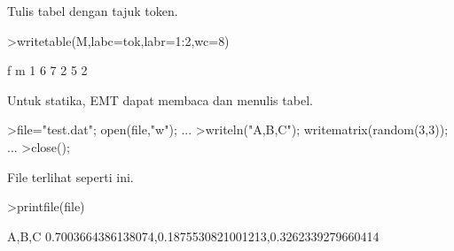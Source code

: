 \documentclass[a4paper,10pt]{article}
\begin{document}
\begin{eulernotebook}
\begin{eulercomment}
\begin{eulercomment}
\begin{eulercomment}
\begin{eulercomment}
\begin{eulercomment}
\begin{eulercomment}
\begin{eulercomment}
\begin{eulercomment}
\begin{eulercomment}
\begin{eulercomment}
\begin{eulercomment}
\begin{eulercomment}
\begin{eulercomment}
\begin{eulercomment}
\begin{eulercomment}
\begin{eulercomment}
\begin{eulercomment}
\begin{eulercomment}
\begin{eulercomment}
\begin{eulercomment}
\begin{eulercomment}
\begin{eulercomment}
\begin{eulercomment}
\begin{eulercomment}
\begin{eulercomment}
\begin{eulercomment}
\begin{eulercomment}
\begin{eulercomment}
\begin{eulercomment}
\begin{eulercomment}
\begin{eulercomment}
\begin{eulercomment}
\begin{eulercomment}
\begin{eulercomment}
\begin{eulercomment}
\begin{eulercomment}
\begin{eulercomment}
\begin{eulercomment}
\begin{eulercomment}
\begin{eulercomment}
\begin{eulercomment}
\begin{eulercomment}
\begin{eulercomment}
\begin{eulercomment}
\begin{eulercomment}
\begin{eulercomment}
\begin{eulercomment}
\begin{eulercomment}
\begin{eulercomment}
\begin{eulercomment}
\begin{eulercomment}
Tulis tabel dengan tajuk token.
\end{eulercomment}
\begin{eulerprompt}
>writetable(M,labc=tok,labr=1:2,wc=8)
\end{eulerprompt}
\begin{euleroutput}
                 f       m
         1       6       7
         2       5       2
\end{euleroutput}
\begin{eulercomment}
Untuk statika, EMT dapat membaca dan menulis tabel.
\end{eulercomment}
\begin{eulerprompt}
>file="test.dat"; open(file,"w"); ...
>writeln("A,B,C"); writematrix(random(3,3)); ...
>close();
\end{eulerprompt}
\begin{eulercomment}
File terlihat seperti ini.
\end{eulercomment}
\begin{eulerprompt}
>printfile(file)
\end{eulerprompt}
\begin{euleroutput}
  A,B,C
  0.7003664386138074,0.1875530821001213,0.3262339279660414

\end{euleroutput}
\end{eulercomment}
\end{eulercomment}
\end{eulercomment}
\end{eulercomment}
\end{eulercomment}
\end{eulercomment}
\end{eulercomment}
\end{eulercomment}
\end{eulercomment}
\end{eulercomment}
\end{eulercomment}
\end{eulercomment}
\end{eulercomment}
\end{eulercomment}
\end{eulercomment}
\end{eulercomment}
\end{eulercomment}
\end{eulercomment}
\end{eulercomment}
\end{eulercomment}
\end{eulercomment}
\end{eulercomment}
\end{eulercomment}
\end{eulercomment}
\end{eulercomment}
\end{eulercomment}
\end{eulercomment}
\end{eulercomment}
\end{eulercomment}
\end{eulercomment}
\end{eulercomment}
\end{eulercomment}
\end{eulercomment}
\end{eulercomment}
\end{eulercomment}
\end{eulercomment}
\end{eulercomment}
\end{eulercomment}
\end{eulercomment}
\end{eulercomment}
\end{eulercomment}
\end{eulercomment}
\end{eulercomment}
\end{eulercomment}
\end{eulercomment}
\end{eulercomment}
\end{eulercomment}
\end{eulercomment}
\end{eulercomment}
\end{eulercomment}
\end{eulernotebook}
\end{document}
